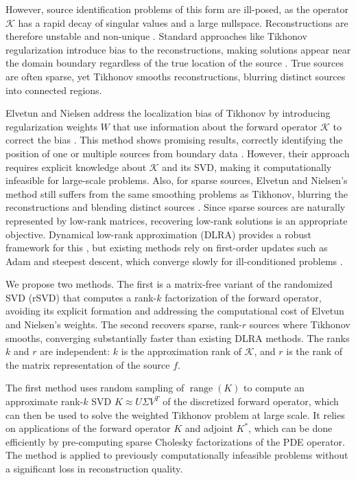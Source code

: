 However, source identification problems of this form are ill-posed, as the operator $\mathcal K$ has a rapid decay of singular values and a large nullspace. Reconstructions are therefore unstable and non-unique \cite{hansen2010discrete}. Standard approaches like Tikhonov regularization introduce bias to the reconstructions, making solutions appear near the domain boundary regardless of the true location of the source \cite{elvetunRegularizationOperatorSource2020}. True sources are often sparse, yet Tikhonov smooths reconstructions, blurring distinct sources into connected regions.

Elvetun and Nielsen address the localization bias of Tikhonov by introducing regularization weights $W$ that use information about the forward operator $\mathcal{K}$ to correct the bias \cite{elvetunRegularizationOperatorSource2020}. This method shows promising results, correctly identifying the position of one or multiple sources from boundary data \cite{elvetunRegularizationOperatorSource2020,elvetunModifiedTikhonovRegularization2020}. However, their approach requires explicit knowledge about $\mathcal{K}$ and its SVD, making it computationally infeasible for large-scale problems. Also, for sparse sources, Elvetun and Nielsen's method still suffers from the same smoothing problems as Tikhonov, blurring the reconstructions and blending distinct sources \cite{elvetunModifiedTikhonovRegularization2020}. 
Since sparse sources are naturally represented by low-rank matrices, recovering low-rank solutions is an appropriate objective. Dynamical low-rank approximation (DLRA) provides a robust framework for this \cite{schotthoferLowrankLotteryTickets2022}, but existing methods rely on first-order updates such as Adam \cite{kingmaAdamMethodStochastic2017} and steepest descent, which converge slowly for ill-conditioned problems \cite{chong2023introduction,hansen2010discrete,nocedal2006numerical}.

We propose two methods. The first is a matrix-free variant of the randomized SVD (rSVD) that computes a rank-$k$ factorization of the forward operator, avoiding its explicit formation and addressing the computational cost of Elvetun and Nielsen's 
weights. The second recovers sparse, rank-$r$ sources where Tikhonov smooths, converging substantially faster than existing DLRA methods. The ranks $k$ and $r$ are independent: $k$ is the approximation rank of $\mathcal{K}$, and $r$ is the rank of the matrix representation of the source $f$.

The first method uses random sampling of $\operatorname{range}(K)$ to compute an approximate rank-$k$ SVD $K \approx U \Sigma V^T$ of the discretized forward operator, which can then be used to solve the weighted Tikhonov problem at large scale. It relies on applications of the forward operator $K$ and adjoint $K^*$, which can be done efficiently by pre-computing sparse Cholesky factorizations of the PDE operator. The method is applied to previously computationally infeasible problems without a significant loss in reconstruction quality.

